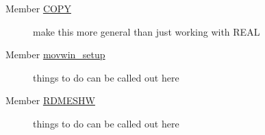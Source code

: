 \label{todo__todo000002}
\hypertarget{todo__todo000002}{}
 \begin{description}
\item[Member \hyperlink{mat1_8F_1a5a579737d4fee8077fac949517f1d3}{COPY} ]make this more general than just working with REAL \end{description}


\label{todo__todo000003}
\hypertarget{todo__todo000003}{}
 \begin{description}
\item[Member \hyperlink{movwin_8F_cd12f456fef33becb50793608b263021}{movwin\_\-setup} ]things to do can be called out here \end{description}


\label{todo__todo000004}
\hypertarget{todo__todo000004}{}
 \begin{description}
\item[Member \hyperlink{movwin_8F_da38f8a5d8e3a060270b20f61e8a2a48}{RDMESHW} ]things to do can be called out here \end{description}
